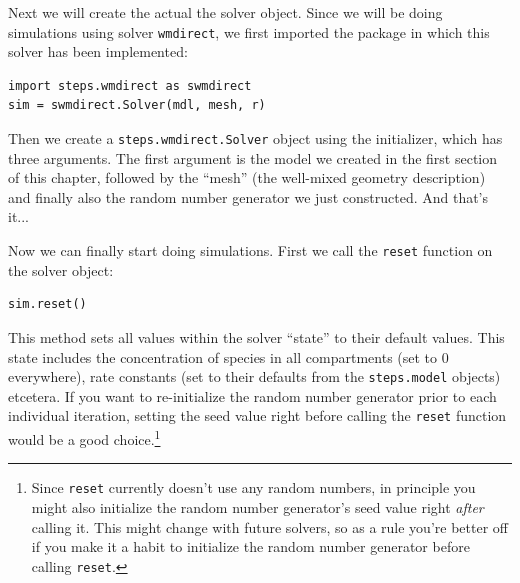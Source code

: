 \documentclass[a4paper,12pt]{book}
\begin{document}
Next we will create the actual the solver object. Since we will be doing simulations using solver \texttt{wmdirect}, we first imported the package in which this solver has been implemented:
\begin{verbatim}
import steps.wmdirect as swmdirect
sim = swmdirect.Solver(mdl, mesh, r)
\end{verbatim}
Then we create a \texttt{steps.wmdirect.Solver} object using the initializer, which has three arguments. The first argument is the model we created in the first section of this chapter, followed by the ``mesh'' (the well-mixed geometry description) and finally also the random number generator we just constructed. And that's it... 

Now we can finally start doing simulations. First we call the \texttt{reset} function on the solver object:
\begin{verbatim}
sim.reset()
\end{verbatim}
This method sets all values within the solver ``state'' to their default values. This state includes the concentration of species in all compartments (set to 0 everywhere), rate constants (set to their defaults from the \texttt{steps.model} objects) etcetera. If you want to re-initialize the random number generator prior to each individual iteration, setting the seed value right before calling the \texttt{reset} function would be a good choice.\footnote{Since \texttt{reset} currently doesn't use any random numbers, in principle you might also initialize the random number generator's seed value right \emph{after} calling it. This might change with future solvers, so as a rule you're better off if you make it a habit to initialize the random number generator before calling \texttt{reset}.}
\end{document}
